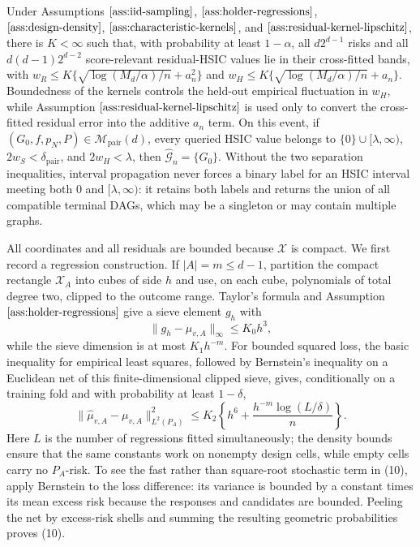 Under Assumptions \(\ref{ass:iid-sampling}\), \(\ref{ass:holder-regressions}\), \(\ref{ass:design-density}\), \(\ref{ass:characteristic-kernels}\), and \(\ref{ass:residual-kernel-lipschitz}\), there is \(K<\infty\) such that, with probability at least \(1-\alpha\), all \(d2^{d-1}\) risks and all \(d(d-1)2^{d-2}\) score-relevant residual-HSIC values lie in their cross-fitted bands, with \(w_R\le K\{\sqrt{\log(M_d/\alpha)/n}+a_n^2\}\) and \(w_H\le K\{\sqrt{\log(M_d/\alpha)/n}+a_n\}\). Boundedness of the kernels controls the held-out empirical fluctuation in \(w_H\), while Assumption \(\ref{ass:residual-kernel-lipschitz}\) is used only to convert the cross-fitted residual error into the additive \(a_n\) term. On this event, if \((G_0,f,p_N,P)\in\mathcal M_{\mathrm{pair}}(d)\), every queried HSIC value belongs to \(\{0\}\cup[\lambda,\infty)\), \(2w_S<\delta_{\mathrm{pair}}\), and \(2w_H<\lambda\), then \(\widehat{\mathcal G}_n=\{G_0\}\). Without the two separation inequalities, interval propagation never forces a binary label for an HSIC interval meeting both \(0\) and \([\lambda,\infty)\): it retains both labels and returns the union of all compatible terminal DAGs, which may be a singleton or may contain multiple graphs.

All coordinates and all residuals are bounded because \(\mathcal X\) is compact.  We first record a regression construction.  If \(|A|=m\le d-1\), partition the compact rectangle \(\mathcal X_A\) into cubes of side \(h\) and use, on each cube, polynomials of total degree two, clipped to the outcome range.  Taylor's formula and Assumption \(\ref{ass:holder-regressions}\) give a sieve element \(g_h\) with
\[
 \|g_h-\mu_{v,A}\|_\infty\le K_0h^3,
\]
while the sieve dimension is at most \(K_1h^{-m}\).  For bounded squared loss, the basic inequality for empirical least squares, followed by Bernstein's inequality on a Euclidean net of this finite-dimensional clipped sieve, gives, conditionally on a training fold and with probability at least \(1-\delta\),
\[
 \|\widehat\mu_{v,A}-\mu_{v,A}\|_{L^2(P_A)}^2
 \le K_2\left\{h^6+\frac{h^{-m}\log(L/\delta)}{n}\right\}. \tag{10}
\]
Here \(L\) is the number of regressions fitted simultaneously; the density bounds ensure that the same constants work on nonempty design cells, while empty cells carry no \(P_A\)-risk.  To see the fast rather than square-root stochastic term in (10), apply Bernstein to the loss difference: its variance is bounded by a constant times its mean excess risk because the responses and candidates are bounded.  Peeling the net by excess-risk shells and summing the resulting geometric probabilities proves (10).


